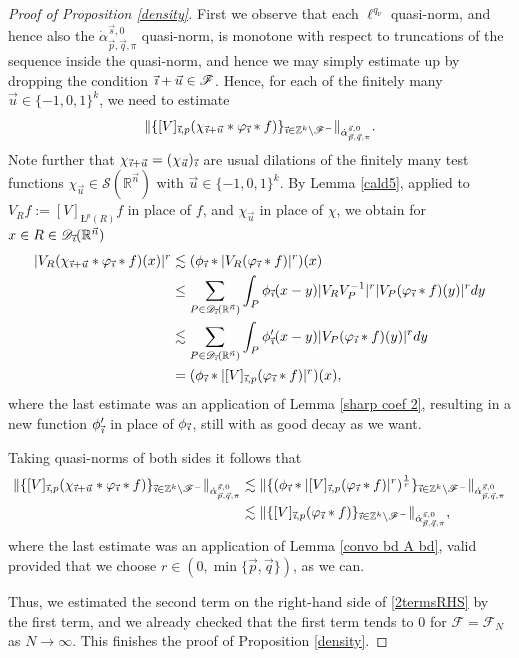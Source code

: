 \documentclass[11pt, reqno]{amsart}
\theoremstyle{definition}
\theoremstyle{remark}
\numberwithin{equation}{section}
\newcommand{\D}{\mathscr D}
\newcommand{\Fs}{\mathscr F}
\newcommand{\R}{\mathbb R}
\newcommand{\Sc}{\mathscr S}
\newcommand{\Z}{\mathbb Z}
\newcommand{\vi}{\vec{\textit{\i}}}
\newcommand{\vn}{\vec n}
\newcommand{\vp}{\vec p}
\newcommand{\vq}{\vec q}
\newcommand{\vu}{\vec u}
\newcommand{\aveL}{\textit{\L}}
\newcommand{\Red}[3]{[#1]_{#2,#3}}
\newcommand{\abs}[1]{|#1|}
\newcommand{\Norm}[2]{\|#1\|_{#2}}
\begin{document}
\begin{proof}[Proof of Proposition \ref{density}]
First we observe that each $\ell^{q_\nu}$ quasi-norm, and hence also the $\dot \alpha_{\vec p,\vec q,\pi}^{\vec s,0}$ quasi-norm, is monotone with respect to truncations of the sequence inside the quasi-norm, and hence we may simply estimate up by dropping the condition $\vi+\vu\in\Fs$. Hence, for each of the finitely many $\vu\in\{-1,0,1\}^k$, we need to estimate
\begin{equation*}
\Norm{\{
\Red{V}{\vi}{p}( \chi_{\vi+\vu} * \varphi_{\vi} * f) \}_{\vi\in\Z^k\setminus\Fs^-}  }{\dot \alpha_{\vec p,\vec q,\pi}^{\vec s,0}}.
\end{equation*}
Note further that $\chi_{\vi+\vu}=(\chi_{\vu})_{\vi}$ are usual dilations of the finitely many test functions $\chi_{\vu}\in\Sc(\R^{\vn})$ with $\vu\in\{-1,0,1\}^k$. By Lemma \ref{cald5}, applied to $V_Rf:=[V]_{\aveL^p(R)}f$ in place of $f$, and $\chi_{\vu}$ in place of $\chi$, we obtain for $x\in R\in\D_{\vi}(\R^{\vn})$
\begin{equation*}
\begin{split}
\abs{V_R(\chi_{\vi+\vu}*\varphi_{\vi} * f)(x)}^r
&\lesssim(\phi_{\vi}*\abs{V_R(\varphi_{\vi} * f)}^r)(x) \\
&\leq\sum_{P\in\D_{\vi}(\R^{\vn})} \int_P\phi_{\vi}(x-y)\abs{V_R V_P^{-1}}^r\abs{V_P(\varphi_{\vi}*f)(y)}^r dy \\
&\lesssim\sum_{P\in\D_{\vi}(\R^{\vn})} \int_P\phi_{\vi}'(x-y)\abs{V_P(\varphi_{\vi}*f)(y)}^r dy \\
&=(\phi_{\vi}*\abs{\Red{V}{\vi}{p}(\varphi_{\vi}*f)}^r)(x),
\end{split}
\end{equation*}
where the last estimate was an application of Lemma \ref{sharp coef 2}, resulting in a new function $\phi_{\vi}'$ in place of $\phi_{\vi}$, still with as good decay as we want.

Taking quasi-norms of both sides it follows that
\begin{equation*}
\begin{split}
\Norm{\{     \Red{V}{\vi}{p}( \chi_{\vi+\vu} * \varphi_{\vi} * f) \}_{\vi\in\Z^k\setminus\Fs^-}  }{\dot \alpha_{\vec p,\vec q,\pi}^{\vec s,0}}
&\lesssim   \Norm{\{(\phi_{\vi}*\abs{\Red{V}{\vi}{p}(\varphi_{\vi} * f)}^r)^{\frac1r}\}_{\vi\in\Z^k\setminus\Fs^-} }{\dot \alpha_{\vec p,\vec q,\pi}^{\vec s,0}} \\
&\lesssim   \Norm{\{\Red{V}{\vi}{p}(\varphi_{\vi} * f)\}_{\vi\in\Z^k\setminus\Fs^-} }{\dot \alpha_{\vec p,\vec q,\pi}^{\vec s,0}},
\end{split}
\end{equation*}
where the last estimate was an application of Lemma \ref{convo bd A bd}, valid provided that we choose $r\in(0,\min\{\vp,\vq\})$, as we can.

Thus, we estimated the second term on the right-hand side of \eqref{2termsRHS} by the first term, and we already checked that the first term tends to $0$ for $\Fs=\Fs_N$ as $N\to\infty$.
This finishes the proof of Proposition \ref{density}.
\end{proof}
\end{document}
